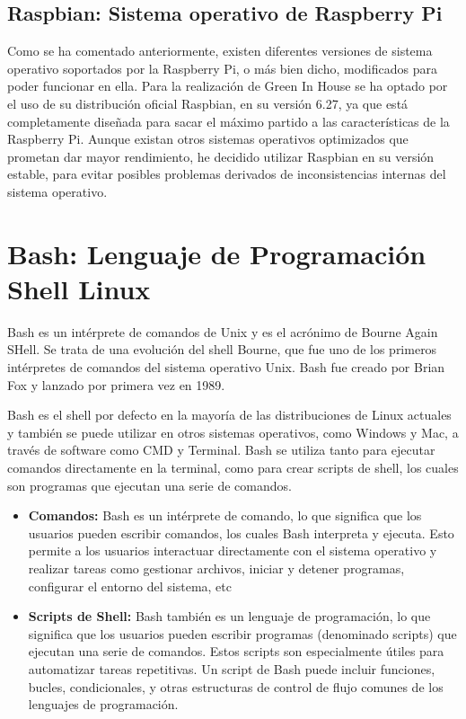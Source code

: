     \subsection{Raspbian: Sistema operativo de Raspberry Pi}
    Como se ha comentado anteriormente, existen diferentes versiones de sistema operativo soportados por la Raspberry Pi, o más bien dicho, modificados para poder funcionar en ella. \cite{download:raspbian}
    Para la realización de Green In House se ha optado por el uso de su distribución oficial Raspbian, en su versión 6.27, ya que está completamente diseñada para sacar el máximo partido a las características de la Raspberry Pi. Aunque existan otros sistemas operativos optimizados que prometan dar mayor rendimiento, he decidido utilizar Raspbian en su versión estable, para evitar posibles problemas derivados de inconsistencias internas del sistema operativo.

\section{Bash: Lenguaje de Programación Shell Linux}
Bash \cite{wiki:bash} es un intérprete de comandos de Unix y es el acrónimo de Bourne Again SHell. Se trata de una evolución del shell Bourne, que fue uno de los primeros intérpretes de comandos del sistema operativo Unix. Bash fue creado por Brian Fox y lanzado por primera vez en 1989. 

Bash es el shell por defecto en la mayoría de las distribuciones de Linux actuales y también se puede utilizar en otros sistemas operativos, como Windows y Mac, a través de software como CMD y Terminal. Bash se utiliza tanto para ejecutar comandos directamente en la terminal, como para crear scripts de shell, los cuales son programas que ejecutan una serie de comandos.

\begin{itemize}
    \item \textbf{Comandos:} Bash es un intérprete de comando, lo que significa que los usuarios pueden escribir comandos, los cuales Bash interpreta y ejecuta. Esto permite a los usuarios interactuar directamente con el sistema operativo y realizar tareas como gestionar archivos, iniciar y detener programas, configurar el entorno del sistema, etc
    \item \textbf{Scripts de Shell:} Bash también es un lenguaje de programación, lo que significa que los usuarios pueden escribir programas (denominado scripts) que ejecutan una serie de comandos. Estos scripts son especialmente útiles para automatizar tareas repetitivas. Un script de Bash puede incluir funciones, bucles, condicionales, y otras estructuras de control de flujo comunes de los lenguajes de programación.   
\end{itemize}
